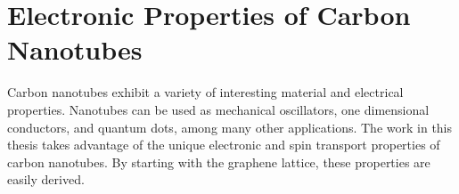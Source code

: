 
\chapter{Electronic Properties of Carbon Nanotubes}
\label{sec:CNT}

Carbon nanotubes exhibit a variety of interesting material and electrical properties. Nanotubes can be used as mechanical oscillators, one dimensional conductors, and quantum dots, among many other applications. The work in this thesis takes advantage of the unique electronic and spin transport properties of carbon nanotubes. By starting with the graphene lattice, these properties are easily derived. 